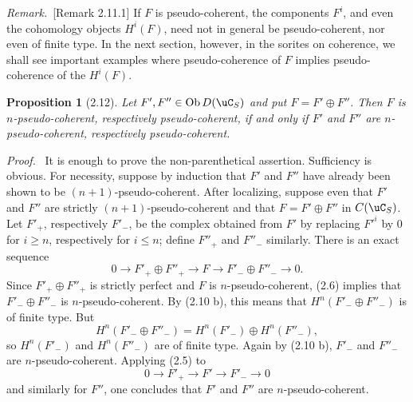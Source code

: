 \documentclass[11pt]{article}
\theoremstyle{plain}
\newtheorem*{proposition*}{Proposition}
\theoremstyle{definition}
\theoremstyle{remark}
\newenvironment{prooftext}{\par\noindent\textit{Proof.}\ }{\par\medskip}
\newenvironment{remarktext}{\par\medskip\noindent\textit{Remark.}\ }{\par\medskip}
\DeclareMathOperator{\ob}{Ob}
\begin{document}
\begin{remarktext}[Remark 2.11.1]
If $F$ is pseudo-coherent, the components $F^i$, and even the cohomology objects $H^i(F)$, need not in general be pseudo-coherent, nor even of finite type. In the next section, however, in the sorites on coherence, we shall see important examples where pseudo-coherence of $F$ implies pseudo-coherence of the $H^i(F)$.
\end{remarktext}

\begin{proposition*}[2.12]
Let $F',F''\in\ob D(\uC_S)$ and put $F=F'\oplus F''$. Then $F$ is $n$-pseudo-coherent, respectively pseudo-coherent, if and only if $F'$ and $F''$ are $n$-pseudo-coherent, respectively pseudo-coherent.
\end{proposition*}

\begin{prooftext}
It is enough to prove the non-parenthetical assertion. Sufficiency is obvious. For necessity, suppose by induction that $F'$ and $F''$ have already been shown to be $(n+1)$-pseudo-coherent. After localizing, suppose even that $F'$ and $F''$ are strictly $(n+1)$-pseudo-coherent and that $F=F'\oplus F''$ in $C(\uC_S)$. Let $F'_+$, respectively $F'_-$, be the complex obtained from $F'$ by replacing $F'^i$ by $0$ for $i\geq n$, respectively for $i\leq n$; define $F''_+$ and $F''_-$ similarly. There is an exact sequence
\[
0\longrightarrow F'_+\oplus F''_+\longrightarrow F\longrightarrow F'_-\oplus F''_-\longrightarrow0.
\]
Since $F'_+\oplus F''_+$ is strictly perfect and $F$ is $n$-pseudo-coherent, (2.6) implies that $F'_-\oplus F''_-$ is $n$-pseudo-coherent. By (2.10 b), this means that $H^n(F'_-\oplus F''_-)$ is of finite type. But
\[
H^n(F'_-\oplus F''_-)=H^n(F'_-)
\oplus H^n(F''_-),
\]
so $H^n(F'_-)$ and $H^n(F''_-)$ are of finite type. Again by (2.10 b), $F'_-$ and $F''_-$ are $n$-pseudo-coherent. Applying (2.5) to
\[
0\longrightarrow F'_+\longrightarrow F'\longrightarrow F'_-\longrightarrow0
\]
and similarly for $F''$, one concludes that $F'$ and $F''$ are $n$-pseudo-coherent.
\end{prooftext}
\end{document}
